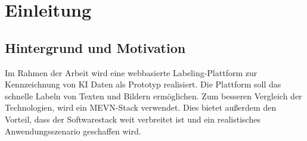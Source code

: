 \chapter{Einleitung}\label{sec:motivation}
\section{Hintergrund und Motivation}

Im Rahmen der Arbeit wird eine webbasierte Labeling-Plattform zur Kennzeichnung von KI Daten als Prototyp realisiert. Die Plattform soll das schnelle Labeln von Texten und Bildern ermöglichen. Zum besseren Vergleich der Technologien, wird ein MEVN-Stack verwendet. Dies bietet außerdem den Vorteil, dass der Softwarestack weit verbreitet ist und ein realistisches Anwendungsszenario geschaffen wird.